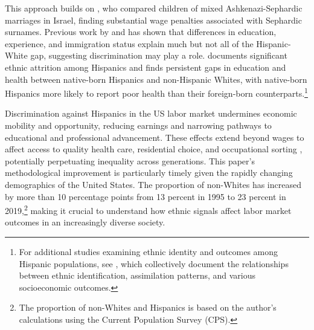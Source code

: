 This approach builds on \textcite{rubinstein2014pride}, who compared children of mixed Ashkenazi-Sephardic marriages in Israel, finding substantial wage penalties associated with Sephardic surnames. Previous work by \textcite{antman2020ethnic} and \textcite{davilaChangesRelativeEarnings2008} has shown that differences in education, experience, and immigration status explain much but not all of the Hispanic-White gap, suggesting discrimination may play a role. \textcite{antman2020ethnic} documents significant ethnic attrition among Hispanics and finds persistent gaps in education and health between native-born Hispanics and non-Hispanic Whites, with native-born Hispanics more likely to report poor health than their foreign-born counterparts.\footnote{For additional studies examining ethnic identity and outcomes among Hispanic populations, see \textcite{antman2020ethnic, antmanEthnicAttritionObserved2016, antmanEthnicAttritionObserved2016a, antmanEthnicAttritionAssimilation2020}, which collectively document the relationships between ethnic identification, assimilation patterns, and various socioeconomic outcomes.}

Discrimination against Hispanics in the US labor market undermines economic mobility and opportunity, reducing earnings and narrowing pathways to educational and professional advancement. These effects extend beyond wages to affect access to quality health care, residential choice, and occupational sorting \autocite{chettyUnitedStatesStill2014, hurst2024task}, potentially perpetuating inequality across generations. This paper's methodological improvement is particularly timely given the rapidly changing demographics of the United States. The proportion of non-Whites has increased by more than 10 percentage points from 13 percent in 1995 to 23 percent in 2019,\footnote{The proportion of non-Whites and Hispanics is based on the author's calculations using the Current Population Survey (CPS).} making it crucial to understand how ethnic signals affect labor market outcomes in an increasingly diverse society.

